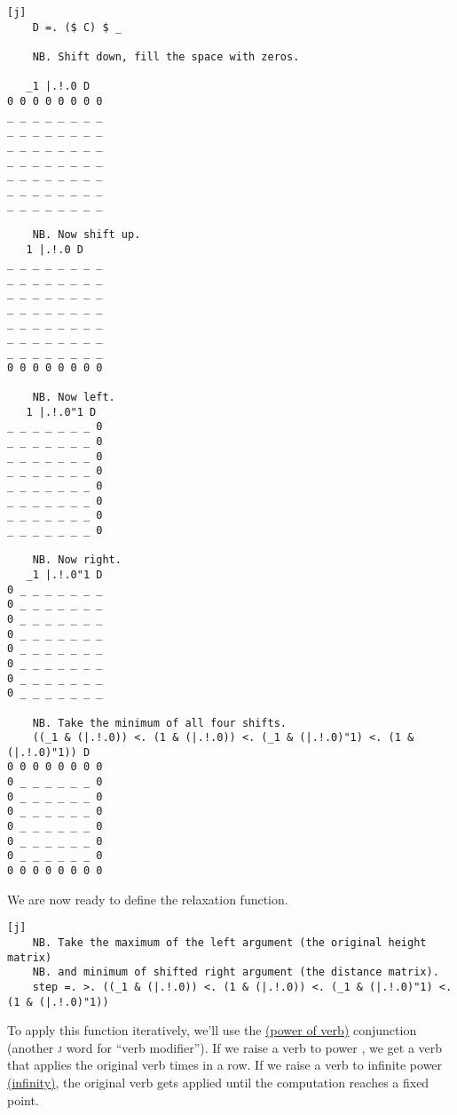 \documentclass{article}
\begin{document}
\begin{verbatim}[j]
    D =. ($ C) $ _

    NB. Shift down, fill the space with zeros.

   _1 |.!.0 D
0 0 0 0 0 0 0 0
_ _ _ _ _ _ _ _
_ _ _ _ _ _ _ _
_ _ _ _ _ _ _ _
_ _ _ _ _ _ _ _
_ _ _ _ _ _ _ _
_ _ _ _ _ _ _ _
_ _ _ _ _ _ _ _

    NB. Now shift up.
   1 |.!.0 D
_ _ _ _ _ _ _ _
_ _ _ _ _ _ _ _
_ _ _ _ _ _ _ _
_ _ _ _ _ _ _ _
_ _ _ _ _ _ _ _
_ _ _ _ _ _ _ _
_ _ _ _ _ _ _ _
0 0 0 0 0 0 0 0

    NB. Now left.
   1 |.!.0"1 D
_ _ _ _ _ _ _ 0
_ _ _ _ _ _ _ 0
_ _ _ _ _ _ _ 0
_ _ _ _ _ _ _ 0
_ _ _ _ _ _ _ 0
_ _ _ _ _ _ _ 0
_ _ _ _ _ _ _ 0
_ _ _ _ _ _ _ 0

    NB. Now right.
   _1 |.!.0"1 D
0 _ _ _ _ _ _ _
0 _ _ _ _ _ _ _
0 _ _ _ _ _ _ _
0 _ _ _ _ _ _ _
0 _ _ _ _ _ _ _
0 _ _ _ _ _ _ _
0 _ _ _ _ _ _ _
0 _ _ _ _ _ _ _

    NB. Take the minimum of all four shifts.
    ((_1 & (|.!.0)) <. (1 & (|.!.0)) <. (_1 & (|.!.0)"1) <. (1 & (|.!.0)"1)) D
0 0 0 0 0 0 0 0
0 _ _ _ _ _ _ 0
0 _ _ _ _ _ _ 0
0 _ _ _ _ _ _ 0
0 _ _ _ _ _ _ 0
0 _ _ _ _ _ _ 0
0 _ _ _ _ _ _ 0
0 0 0 0 0 0 0 0
\end{verbatim}

We are now ready to define the relaxation function.

\begin{verbatim}[j]
    NB. Take the maximum of the left argument (the original height matrix)
    NB. and minimum of shifted right argument (the distance matrix).
    step =. >. ((_1 & (|.!.0)) <. (1 & (|.!.0)) <. (_1 & (|.!.0)"1) <. (1 & (|.!.0)"1))
\end{verbatim}

To apply this function iteratively, we'll use the \href{https://code.jsoftware.com/wiki/Vocabulary/hatco}{\code{^:} (power of verb)} conjunction (another \textsc{j} word for ``verb modifier'').
If we raise a verb to power , we get a verb that applies the original verb  times in a row.
If we raise a verb to infinite power \href{https://code.jsoftware.com/wiki/Vocabulary/under}{\code{_} (infinity)}, the original verb gets applied until the computation reaches a fixed point.
\end{document}
